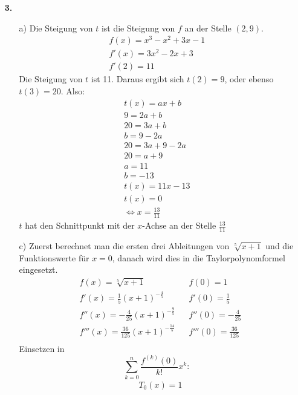 \documentclass[a4paper,11pt,fleqn]{scrartcl}
\begin{document}
\begin{enumerate}
\item[\textbf{3.}]
    \begin{enumerate}
        \item[a)]
            Die Steigung von $t$ ist die Steigung von $f$ an der Stelle $(2,9)$.
            \begin{align*}
                f(x)=x^3-x^2+3x-1\\
                f'(x)=3x^2-2x+3\\
                f'(2)=11
            \end{align*}
            Die Steigung von $t$ ist 11. Daraus ergibt sich $t(2)=9$, oder ebenso $t(3)=20$. Also:
            \begin{align*}
                t(x)=ax+b\\
                9=2a+b\\
                20=3a+b\\
                b=9-2a\\
                20=3a+9-2a\\
                20=a+9\\
                a=11\\
                b=-13\\
                t(x)=11x-13\\
                t(x)=0\\
                \Leftrightarrow x=\frac{13}{11}
            \end{align*}
            $t$ hat den Schnittpunkt mit der $x$-Achse an der Stelle $\frac{13}{11}$
        \item[c)]
            Zuerst berechnet man die ersten drei Ableitungen von $\sqrt[5]{x+1}$ und die Funktionswerte für $x = 0$,
            danach wird dies in die Taylorpolynomformel eingesetzt.
            \begin{align*}
            &f(x) = \sqrt[5]{x+1} && f(0) = 1 \\
            &f'(x) = \frac{1}{5}(x+1)^{-\frac{4}{5}} && f'(0) = \frac{1}{5} \\
            &f''(x) = -\frac{4}{25}(x+1)^{-\frac{9}{5}} && f''(0) = -\frac{4}{25} \\
            &f'''(x) = \frac{36}{125}(x+1)^{-\frac{14}{5}} && f'''(0) = \frac{36}{125} \\
            \end{align*}
            Einsetzen in $$\sum_{k=0}^{n} \frac{f^{(k)}(0)}{k!}x^k:$$ 
            \begin{align*}
            &T_0(x) = 1 \\

\end{align*}
\end{enumerate}
\end{enumerate}
\end{document}
